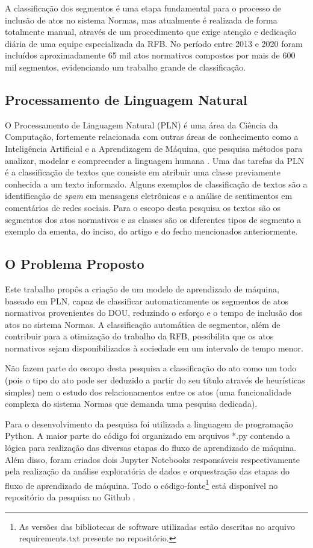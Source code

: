 A classificação dos segmentos é uma etapa fundamental para o processo de inclusão de atos no sistema Normas, mas atualmente é realizada de forma totalmente manual, através de um procedimento que exige atenção e dedicação diária de uma equipe especializada da RFB. No período entre 2013 e 2020 foram incluídos aproximadamente 65 mil atos normativos compostos por mais de 600 mil segmentos, evidenciando um trabalho grande de classificação.

\subsection{Processamento de Linguagem Natural}

O Processamento de Linguagem Natural (PLN) é uma área da Ciência da Computação, fortemente relacionada com outras áreas de conhecimento como a Inteligência Artificial e a Aprendizagem de Máquina, que pesquisa métodos para analizar, modelar e compreender a linguagem humana \cite{PracticalNLP2020}. Uma das tarefas da PLN é a classificação de textos que consiste em atribuir uma classe previamente conhecida a um texto informado. Alguns exemplos de classificação de textos são a identificação de \textit{spam} em mensagens eletrônicas e a análise de sentimentos em comentários de redes sociais. Para o escopo desta pesquisa os textos são os segmentos dos atos normativos e as classes são os diferentes tipos de segmento a exemplo da ementa, do inciso, do artigo e do fecho mencionados anteriormente. 

\subsection{O Problema Proposto}

Este trabalho propôs a criação de um modelo de aprendizado de máquina, baseado em PLN, capaz de classificar automaticamente os segmentos de atos normativos provenientes do DOU, reduzindo o esforço e o tempo de inclusão dos atos no sistema Normas. A classificação automática de segmentos, além de contribuir para a otimização do trabalho da RFB, possibilita que os atos normativos sejam disponibilizados à sociedade em um intervalo de tempo menor.

Não fazem parte do escopo desta pesquisa a classificação do ato como um todo (pois o tipo do ato pode ser deduzido a partir do seu título através de heurísticas simples) nem o estudo dos relacionamentos entre os atos (uma funcionalidade complexa do sistema Normas que demanda uma pesquisa dedicada).

Para o desenvolvimento da pesquisa foi utilizada a linguagem de programação Python. A maior parte do código foi organizado em arquivos *.py contendo a lógica para realização das diversas etapas do fluxo de aprendizado de máquina. Além disso, foram criados dois Jupyter Notebooks responsáveis respectivamente pela realização da análise exploratória de dados e  orquestração das etapas do fluxo de aprendizado de máquina. Todo o código-fonte\footnote{As versões das bibliotecas de software utilizadas estão descritas no arquivo requirements.txt presente no repositório.} está disponível no repositório da pesquisa no Github \cite{Saan2021}.




